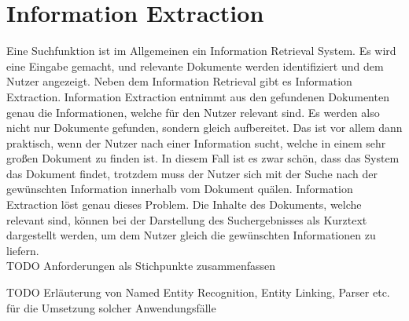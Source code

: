 \section{Information Extraction}
Eine Suchfunktion ist im Allgemeinen ein Information Retrieval System.
Es wird eine Eingabe gemacht, und relevante Dokumente werden identifiziert und dem Nutzer angezeigt.
Neben dem Information Retrieval gibt es Information Extraction.
Information Extraction entnimmt aus den gefundenen Dokumenten genau die Informationen, welche für den Nutzer relevant sind.
Es werden also nicht nur Dokumente gefunden, sondern gleich aufbereitet.
Das ist vor allem dann praktisch, wenn der Nutzer nach einer Information sucht, welche in einem sehr großen Dokument zu finden ist.
In diesem Fall ist es zwar schön, dass das System das Dokument findet, trotzdem muss der Nutzer sich mit der Suche nach der gewünschten Information innerhalb vom Dokument quälen.
Information Extraction löst genau dieses Problem.
Die Inhalte des Dokuments, welche relevant sind, können bei der Darstellung des Suchergebnisses als Kurztext dargestellt werden, um dem Nutzer gleich die gewünschten Informationen zu liefern.\\

TODO Anforderungen als Stichpunkte zusammenfassen

TODO Erläuterung von Named Entity Recognition, Entity Linking, Parser etc. für die Umsetzung solcher Anwendungsfälle\\


